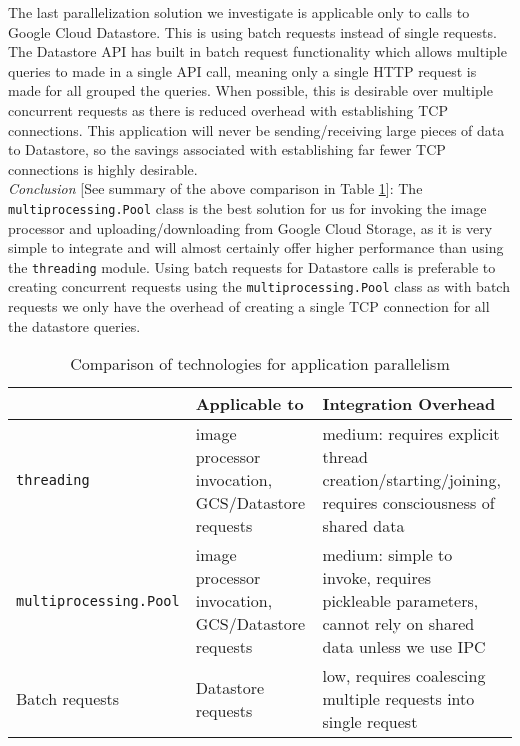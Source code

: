 \documentclass[10pt, onecolumn, draftclsnofoot, letterpaper, compsoc]{IEEEtran}
\begin{document}
The last parallelization solution we investigate is applicable only to calls to
Google Cloud Datastore. This is using batch requests instead of single requests.
The Datastore API has built in batch request functionality which allows multiple
queries to made in a single API call, meaning only a single HTTP request is made
for all grouped the queries\cite{batches}. When possible, this is desirable over
multiple concurrent requests as there is reduced overhead with establishing
TCP connections. This application will never be sending/receiving large
pieces of data to Datastore, so the savings associated with establishing
far fewer TCP connections is highly desirable. \\

\textit{Conclusion} [See summary of the above comparison in Table \ref{table:bret3}]:
The {\tt multiprocessing.Pool} class is the best solution for us
for invoking the image processor and uploading/downloading from Google Cloud
Storage, as it is very simple to integrate and will almost certainly offer
higher performance than using the {\tt threading} module. Using batch requests for
Datastore calls is preferable to creating concurrent requests using the
{\tt multiprocessing.Pool} class as with batch requests we only have the overhead
of creating a single TCP connection for all the datastore queries. \\

\begin{table}[h]
\centering
\caption{Comparison of technologies for application parallelism}
\begin{tabular}{|p{4.2cm}|p{4.2cm}|p{4.2cm}|}
\cline{3-3}
\hline

 & Applicable to & Integration Overhead \\ \hline

{\tt threading} & image processor invocation, GCS/Datastore requests
& medium: requires explicit thread creation/starting/joining,
requires consciousness of shared data \\ \hline

{\tt multiprocessing.Pool} & image processor invocation, GCS/Datastore requests
& medium: simple to invoke, requires pickleable parameters, cannot rely
on shared data unless we use IPC \\ \hline

Batch requests & Datastore requests & low, requires coalescing multiple
requests into single request  \\ \hline

\end{tabular}
\label{table:bret3}
\end{table}
\end{document}

